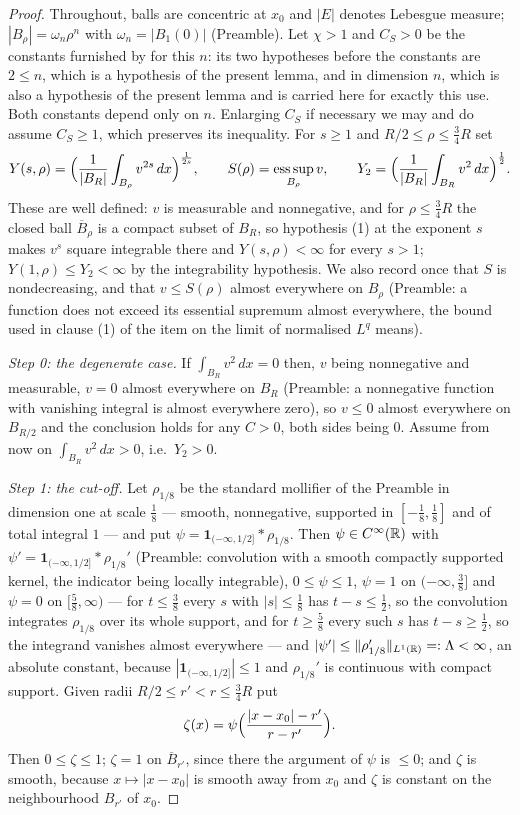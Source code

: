\begin{proof}
Throughout, balls are concentric at $x_0$ and $|E|$ denotes Lebesgue measure;
$|B_\rho|=\omega_n\rho^n$ with $\omega_n=|B_1(0)|$ (Preamble).  Let $\chi>1$ and
$C_S>0$ be the constants furnished by  for this
$n$: its two hypotheses before the constants are $2\le n$, which is a hypothesis
of the present lemma, and  in dimension $n$,
which is also a hypothesis of the present lemma and is carried here for exactly
this use.  Both constants depend only on $n$.
Enlarging $C_S$ if necessary we may and do assume $C_S\ge1$, which preserves its
inequality.  For $s\ge1$ and $R/2\le\rho\le\frac34R$ set
\[
Y(s,\rho)=\Bigl(\frac1{|B_R|}\int_{B_\rho}v^{2s}\,dx\Bigr)^{\frac1{2s}},
\qquad
S(\rho)=\operatorname*{ess\,sup}_{B_\rho}v,
\qquad
Y_2=\Bigl(\frac1{|B_R|}\int_{B_R}v^2\,dx\Bigr)^{\frac12}.
\]
These are well defined: $v$ is measurable and nonnegative, and for
$\rho\le\frac34R$ the closed ball $\overline B_\rho$ is a compact subset of
$B_R$, so hypothesis (1) at the exponent $s$ makes $v^s$ square integrable there
and $Y(s,\rho)<\infty$ for every $s>1$; $Y(1,\rho)\le Y_2<\infty$ by the
integrability hypothesis.  We also record once that $S$ is nondecreasing, and
that $v\le S(\rho)$ almost everywhere on $B_\rho$ (Preamble: a function does not
exceed its essential supremum almost everywhere, the bound used in clause (1) of
the item on the limit of normalised $L^q$ means).

\emph{Step 0: the degenerate case.}  If $\int_{B_R}v^2\,dx=0$ then, $v$ being
nonnegative and measurable, $v=0$ almost everywhere on $B_R$ (Preamble: a
nonnegative function with vanishing integral is almost everywhere zero), so
$v\le0$ almost everywhere on $B_{R/2}$ and the conclusion holds for any $C>0$,
both sides being $0$.  Assume from now on $\int_{B_R}v^2\,dx>0$, i.e.\ $Y_2>0$.

\emph{Step 1: the cut-off.}  Let $\rho_{1/8}$ be the standard mollifier of the
Preamble in dimension one at scale $\tfrac18$ --- smooth, nonnegative, supported
in $[-\tfrac18,\tfrac18]$ and of total integral $1$ --- and put
$\psi=\mathbf1_{(-\infty,1/2]}*\rho_{1/8}$.  Then $\psi\in C^\infty(\mathbb{R})$ with
$\psi'=\mathbf1_{(-\infty,1/2]}*\rho_{1/8}'$ (Preamble: convolution with a smooth
compactly supported kernel, the indicator being locally integrable),
$0\le\psi\le1$,
$\psi=1$ on $(-\infty,\tfrac38]$ and $\psi=0$ on $[\tfrac58,\infty)$ --- for
$t\le\tfrac38$ every $s$ with $|s|\le\tfrac18$ has $t-s\le\tfrac12$, so the
convolution integrates $\rho_{1/8}$ over its whole support, and for
$t\ge\tfrac58$ every such $s$ has $t-s\ge\tfrac12$, so the integrand vanishes
almost everywhere --- and
$|\psi'|\le\|\rho_{1/8}'\|_{L^1(\mathbb{R})}=:\Lambda<\infty$, an absolute constant,
because $|\mathbf1_{(-\infty,1/2]}|\le1$ and $\rho_{1/8}'$ is continuous with
compact support.  Given radii
$R/2\le r'<r\le\frac34R$ put
\[
\zeta(x)=\psi\Bigl(\frac{|x-x_0|-r'}{r-r'}\Bigr).
\]
Then $0\le\zeta\le1$; $\zeta=1$ on $\overline B_{r'}$, since there the argument
of $\psi$ is $\le0$; and $\zeta$ is smooth, because $x\mapsto|x-x_0|$ is smooth
away from $x_0$ and $\zeta$ is constant on the neighbourhood $B_{r'}$ of $x_0$.


\end{proof}
